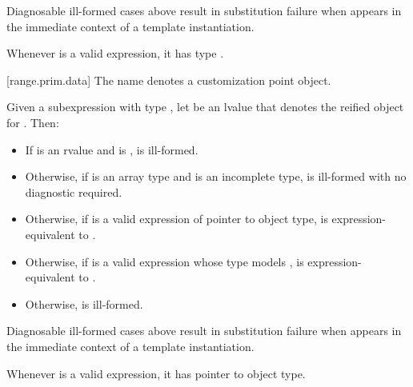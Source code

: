 \pnum
\begin{note}
Diagnosable ill-formed cases above
result in substitution failure when 
appears in the immediate context of a template instantiation.
\end{note}

\pnum
\begin{note}
Whenever  is a valid expression,
it has type .
\end{note}

[range.prim.data]{}
\pnum
The name  denotes a customization point
object.

\pnum
Given a subexpression  with type ,
let  be an lvalue that denotes the reified object for .
Then:

\begin{itemize}
\item
  If  is an rvalue and
   is ,
   is ill-formed.

\item
  Otherwise, if  is an array type and
   is an incomplete type,
   is ill-formed with no diagnostic required.

\item
  Otherwise, if 
  is a valid expression of pointer to object type,
   is expression-equivalent to
  .

\item
  Otherwise, if 
  is a valid expression whose type models
  ,
   is expression-equivalent to
  .

\item
  Otherwise,  is ill-formed.
\end{itemize}

\pnum
\begin{note}
Diagnosable ill-formed cases above
result in substitution failure when 
appears in the immediate context of a template instantiation.
\end{note}

\pnum
\begin{note}
Whenever  is a valid expression, it
has pointer to object type.
\end{note}

